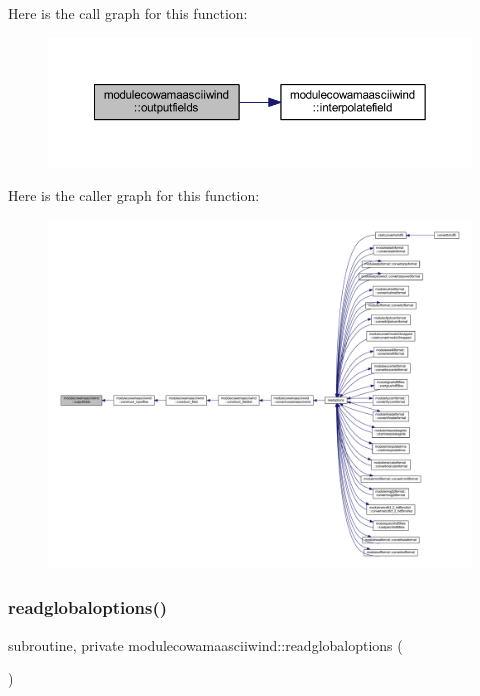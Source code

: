Here is the call graph for this function\+:\nopagebreak
\begin{figure}[H]
\begin{center}
\leavevmode
\includegraphics[width=350pt]{namespacemodulecowamaasciiwind_a67476e8fa757d63b3e48664bcc8b1b96_cgraph}
\end{center}
\end{figure}
Here is the caller graph for this function\+:\nopagebreak
\begin{figure}[H]
\begin{center}
\leavevmode
\includegraphics[width=350pt]{namespacemodulecowamaasciiwind_a67476e8fa757d63b3e48664bcc8b1b96_icgraph}
\end{center}
\end{figure}
\mbox{\label{namespacemodulecowamaasciiwind_a8a6f6a971c31c5b3f8b965bb818c1cbc}} 
\subsubsection{\texorpdfstring{readglobaloptions()}{readglobaloptions()}}
{\footnotesize\ttfamily subroutine, private modulecowamaasciiwind\+::readglobaloptions (\begin{DoxyParamCaption}{ }\end{DoxyParamCaption})\hspace{0.3cm}{\ttfamily [private]}}

